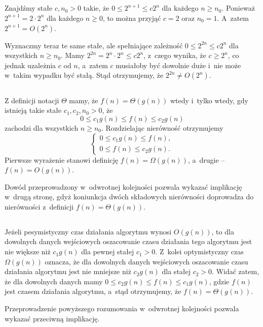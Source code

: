 \subsection{} %
Znajdźmy stałe $c,n_0>0$ takie, że $0\le 2^{n+1}\le c2^n$ dla każdego $n\ge n_0$. Ponieważ $2^{n+1}=2\cdot 2^n$ dla każdego $n\ge 0$, to można przyjąć $c=2$ oraz $n_0=1$. A~zatem $2^{n+1} = O(2^n)$.

Wyznaczmy teraz te same stałe, ale spełniające zależność $0\le 2^{2n}\le c2^n$ dla wszystkich $n\ge n_0$. Mamy $2^{2n}=2^n\cdot 2^n\le c2^n$, z~czego wynika, że $c\ge 2^n$, co jednak uzależnia $c$ od $n$, a~zatem $c$ musiałoby być dowolnie duże i~nie może w~takim wypadku być stałą. Stąd otrzymujemy, że $2^{2n}\ne O(2^n)$.

\subsection{} %
Z definicji notacji $\Theta$ mamy, że $f(n)=\Theta(g(n))$ wtedy i~tylko wtedy, gdy istnieją takie stałe $c_1,c_2,n_0>0$, że
\[
	0\le c_1g(n)\le f(n)\le c_2g(n)
\]
zachodzi dla wszystkich $n\ge n_0$. Rozdzielając nierówność otrzymujemy
\[
	\left\{\begin{array}{c}
		0\le c_1g(n)\le f(n), \\
		0\le f(n)\le c_2g(n).
	\end{array}\right.
\]
Pierwsze wyrażenie stanowi definicję $f(n)=\Omega(g(n))$, a~drugie -- $f(n)=O(g(n))$.

Dowód przeprowadzony w~odwrotnej kolejności pozwala wykazać implikację w~drugą stronę, gdyż koniunkcja dwóch składowych nierówności doprowadza do nierówności z~definicji $f(n)=\Theta(g(n))$.

\subsection{} %
Jeżeli pesymistyczny czas działania algorytmu wynosi $O(g(n))$, to dla dowolnych danych wejściowych oszacowanie czasu działania tego algorytmu jest nie większe niż $c_1g(n)$ dla pewnej stałej $c_1>0$. Z~kolei optymistyczny czas $\Omega(g(n))$ oznacza, że dla dowolnych danych wejściowych oszacowanie czasu działania algorytmu jest nie mniejsze niż $c_2g(n)$ dla stałej $c_2>0$. Widać zatem, że dla dowolnych danych mamy $0\le c_2g(n)\le f(n)\le c_1g(n)$, gdzie $f(n)$ jest czasem działania algorytmu, a~stąd otrzymujemy, że $f(n) = \Theta(g(n))$.

Przeprowadzenie powyższego rozumowania w~odwrotnej kolejności pozwala wykazać przeciwną implikację.

